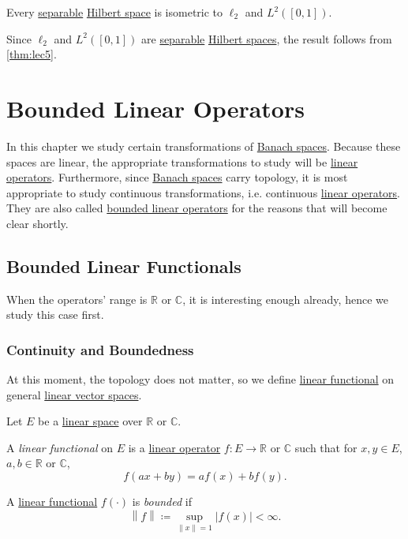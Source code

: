 \begin{remark}
	Every \hyperref[def:separable]{separable} \hyperref[def:Hilbert-space]{Hilbert space} is isometric to \(\ell _2\) and \(L^2([0, 1])\).
\end{remark}
\begin{explanation}
	Since \(\ell _2\) and \(L^2([0, 1])\) are \hyperref[def:separable]{separable} \hyperref[def:Hilbert-space]{Hilbert spaces}, the result follows from \autoref{thm:lec5}.
\end{explanation}

\chapter{Bounded Linear Operators}
In this chapter we study certain transformations of \hyperref[def:Banach-space]{Banach spaces}. Because these spaces are linear, the appropriate transformations to study will be \hyperref[def:linear-op]{linear operators}. Furthermore, since \hyperref[def:Banach-space]{Banach spaces} carry topology, it is most appropriate to study continuous transformations, i.e. continuous \hyperref[def:linear-op]{linear operators}. They are also called \hyperref[def:bounded-linear-op]{bounded linear operators} for the reasons that will become clear shortly.

\section{Bounded Linear Functionals}
When the operators' range is \(\mathbb{R} \) or \(\mathbb{C} \), it is interesting enough already, hence we study this case first.

\subsection{Continuity and Boundedness}
At this moment, the topology does not matter, so we define \hyperref[def:linear-functional]{linear functional} on general \hyperref[def:linear-vector-space]{linear vector spaces}.

\begin{definition*}
	Let \(E\) be a \hyperref[def:linear-vector-space]{linear space} over \(\mathbb{R} \) or \(\mathbb{C} \).
	\begin{definition}\label{def:linear-functional}
		A \emph{linear functional} on \(E\) is a \hyperref[def:linear-op]{linear operator} \(f\colon E\to \mathbb{R} \) or \(\mathbb{C} \) such that for \(x, y\in E\), \(a, b\in \mathbb{R} \) or \(\mathbb{C} \),
		\[
			f(ax + by) = af(x) + bf(y).
		\]
	\end{definition}
	\begin{definition}\label{def:bounded-linear-functional}
		A \hyperref[def:linear-functional]{linear functional} \(f(\cdot)\) is \emph{bounded} if
		\[
			\left\lVert f\right\rVert \coloneqq \sup _{\left\lVert x\right\rVert = 1}\left\vert f(x) \right\vert  < \infty.
		\]
	\end{definition}
\end{definition*}

